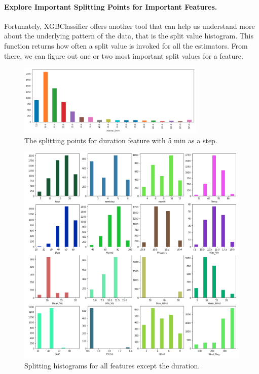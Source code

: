\documentclass[a4paper]{article}
\begin{document}
			\paragraph{Explore Important Splitting Points for Important Features.}
			Fortunately, XGBClassifier offers another tool that can help us understand more about the underlying pattern of the data, that is the split value histogram. This function returns how often a split value is invoked for all the estimators. From there, we can figure out one or two most important split values for a feature.		
			
			\begin{figure}
				\centering
				\includegraphics[width=0.8\textwidth]{DurationSplit.png}
				\caption{\label{fig:duration_split}The splitting points for duration feature with 5 min as a step.}	
			\end{figure}
			
			\begin{figure}
				\centering
				\includegraphics[width=1\textwidth]{FeatureSplit.png}
				\caption{\label{fig:feature_split}Splitting histograms for all features except the duration.}	
			\end{figure}
			
\end{document}
